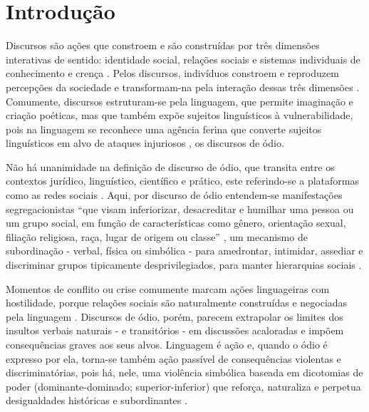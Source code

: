 \documentclass[portuguese]{textolivre}
\begin{document}
\begin{polyabstract}
\begin{english}
\begin{abstract}
\end{abstract}
\end{english}
\end{polyabstract}

\section{Introdução}\label{sec-intro}
Discursos são ações que constroem e são construídas por três dimensões interativas de sentido: identidade social, relações sociais e sistemas individuais de conhecimento e crença \cite{fairclough2001}. Pelos discursos, indivíduos constroem e reproduzem percepções da sociedade e transformam-na pela interação dessas três dimensões \cite{fairclough2001}. Comumente, discursos estruturam-se pela linguagem, que permite imaginação e criação poéticas, mas que também expõe sujeitos linguísticos à vulnerabilidade, pois na linguagem se reconhece uma agência ferina que converte sujeitos linguísticos em alvo de ataques injuriosos \cite{butler2021discurso}, os discursos de ódio.

Não há unanimidade na definição de discurso de ódio, que transita entre os contextos jurídico, linguístico, científico e prático, este referindo-se a plataformas como as redes sociais \cite{papcunova2023hate}. Aqui, por discurso de ódio entendem-se manifestações segregacionistas “que visam inferiorizar, desacreditar e humilhar uma pessoa ou um grupo social, em função de características como gênero, orientação sexual, filiação religiosa, raça, lugar de origem ou classe” \cite{trindade2022discurso}, um mecanismo de subordinação - verbal, física ou simbólica - para amedrontar, intimidar, assediar e discriminar \cite{lederer1995} grupos tipicamente desprivilegiados, para manter hierarquias sociais \cite{harff2021discurso}.

Momentos de conflito ou crise comumente marcam ações linguageiras com hostilidade, porque relações sociais são naturalmente construídas e negociadas pela linguagem \cite{kopytowska2017stereotypes}. Discursos de ódio, porém, parecem extrapolar os limites dos insultos verbais naturais - e transitórios - em discussões acaloradas e impõem consequências graves aos seus alvos. Linguagem é ação \cite{austin2009things} e, quando o ódio é expresso por ela, torna-se também ação passível de consequências violentas e discriminatórias, pois há, nele, uma violência simbólica baseada em dicotomias de poder (dominante-dominado; superior-inferior) que reforça, naturaliza e perpetua desigualdades históricas e subordinantes \cite{souzade2020discurso}.
\end{document}
